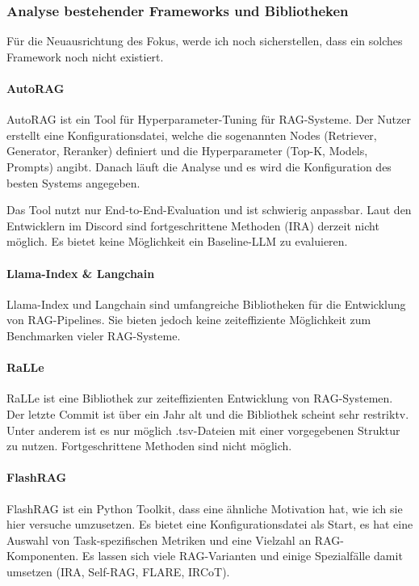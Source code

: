 \documentclass[letterpaper, 10 pt, conference]{ieeeconf}
\begin{document}
\subsubsection{Analyse bestehender Frameworks und Bibliotheken}

Für die Neuausrichtung des Fokus, werde ich noch sicherstellen, dass ein solches Framework noch nicht existiert.

\paragraph{AutoRAG\cite{AutoRAG}}
AutoRAG ist ein Tool für Hyperparameter-Tuning für RAG-Systeme. Der Nutzer erstellt eine Konfigurationsdatei, welche 
die sogenannten Nodes (Retriever, Generator, Reranker) definiert und die Hyperparameter (Top-K, Models, Prompts) angibt. 
Danach läuft die Analyse und es wird die Konfiguration des besten Systems angegeben. 

Das Tool nutzt nur End-to-End-Evaluation und ist schwierig anpassbar. Laut den Entwicklern im Discord sind fortgeschrittene Methoden (IRA) derzeit nicht möglich. 
Es bietet keine Möglichkeit ein Baseline-LLM zu evaluieren. 

\paragraph{Llama-Index\cite{Liu_LlamaIndex_2022} \& Langchain\cite{Chase_LangChain_2022}}
Llama-Index und Langchain sind umfangreiche Bibliotheken für die Entwicklung von RAG-Pipelines. 
Sie bieten jedoch keine zeiteffiziente Möglichkeit zum Benchmarken vieler RAG-Systeme.

\paragraph{RaLLe\cite{ralle}}
RaLLe ist eine Bibliothek zur zeiteffizienten Entwicklung von RAG-Systemen. Der letzte Commit ist über ein Jahr alt und die Bibliothek scheint sehr restriktv. Unter anderem ist es nur möglich .tsv-Dateien mit einer vorgegebenen Struktur zu nutzen. Fortgeschrittene Methoden sind nicht möglich.

\paragraph{FlashRAG\cite{FlashRAG}}

FlashRAG ist ein Python Toolkit, dass eine ähnliche Motivation hat, wie ich sie hier versuche umzusetzen. 
Es bietet eine Konfigurationsdatei als Start, es hat eine Auswahl von Task-spezifischen Metriken und eine Vielzahl an RAG-Komponenten. Es lassen sich viele RAG-Varianten und einige Spezialfälle damit umsetzen (IRA, Self-RAG\cite{Asai.10172023}, FLARE\cite{Jiang.5112023}, IRCoT\cite{Trivedi.12202022}).
\end{document}
